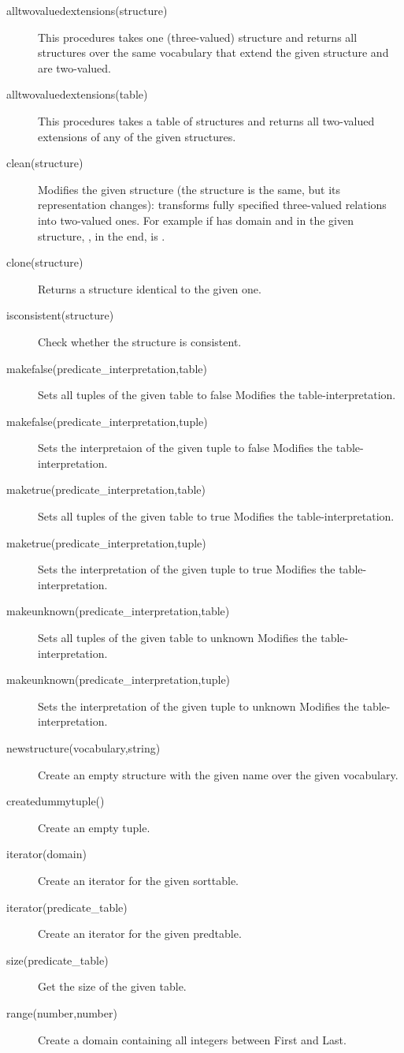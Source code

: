 \begin{description}
	\item[alltwovaluedextensions(structure)] This procedures takes one (three-valued) structure and returns all structures over the same vocabulary that extend the given structure and are two-valued.
	\item[alltwovaluedextensions(table)]
		This procedures takes a table of structures and returns all two-valued extensions of any of the given structures.
	\item[clean(structure)]
		Modifies the given structure (the structure is the same, but its representation changes): transforms fully specified three-valued relations into two-valued ones.  For example if  has domain \code[1..2] and in the given structure, , in the end,  is .
	\item[clone(structure)]
		Returns a structure identical to the given one.
	\item[isconsistent(structure)]
 		Check whether the structure is consistent.
	\item[makefalse(predicate\_interpretation,table)]
 		Sets all tuples of the given table to false
 		Modifies the table-interpretation.
	\item[makefalse(predicate\_interpretation,tuple)]
 		Sets the interpretaion of the given tuple to false
 		Modifies the table-interpretation.
	\item[maketrue(predicate\_interpretation,table)]
 		Sets all tuples of the given table to true
 		Modifies the table-interpretation.
	\item[maketrue(predicate\_interpretation,tuple)]
 		Sets the interpretation of the given tuple to true
 		Modifies the table-interpretation.
	\item[makeunknown(predicate\_interpretation,table)]
 		Sets all tuples of the given table to unknown
 		Modifies the table-interpretation.
	\item[makeunknown(predicate\_interpretation,tuple)]
 		Sets the interpretation of the given tuple to unknown
 		Modifies the table-interpretation.
	\item[newstructure(vocabulary,string)]
 		Create an empty structure with the given name over the given vocabulary.
 		
 	\item[createdummytuple()]
		Create an empty tuple.
	
	\item[iterator(domain)]
 		Create an iterator for the given sorttable.
	\item[iterator(predicate\_table)]
 		Create an iterator for the given predtable.
	\item[size(predicate\_table)]
 		Get the size of the given table.
 		
 	\item[range(number,number)]
 		Create a domain containing all integers between First and Last.
\end{description}



